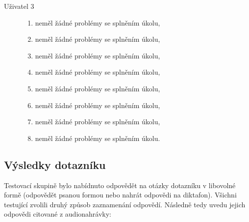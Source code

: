 \documentclass[thesis=B,czech]{FITthesis}[2012/06/26]
\begin{document}
\begin{description}
		\item[Uživatel 3]  \hspace*{\fill} 
				\begin{enumerate}
			\item neměl žádné problémy se splněním úkolu,
			\item neměl žádné problémy se splněním úkolu,
			\item neměl žádné problémy se splněním úkolu,
			\item neměl žádné problémy se splněním úkolu,
			\item neměl žádné problémy se splněním úkolu,
			\item neměl žádné problémy se splněním úkolu,
			\item neměl žádné problémy se splněním úkolu,
			\item neměl žádné problémy se splněním úkolu.
		\end{enumerate}
			
\end{description}

\subsection{Výsledky dotazníku}
Testovací skupině bylo nabídnuto odpovědět na otázky dotazníku v libovolné formě (odpovědět psanou formou nebo nahrát odpovědi na diktafon). Všichni testující zvolili druhý způsob zaznamenání odpovědí. Následně tedy uvedu jejich odpovědi citované z audionahrávky:
\end{document}
